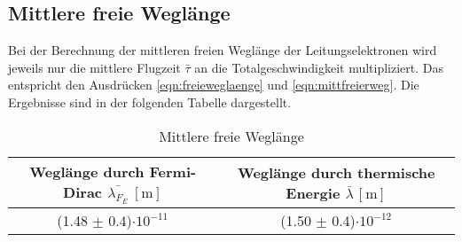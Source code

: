 \subsection{Mittlere freie Weglänge}
Bei der Berechnung der mittleren freien Weglänge der Leitungselektronen wird jeweils nur die mittlere Flugzeit $\bar{\tau}$ an die Totalgeschwindigkeit multipliziert.
Das entspricht den Ausdrücken \eqref{eqn:freieweglaenge} und \eqref{eqn:mittfreierweg}.
Die Ergebnisse sind in der folgenden Tabelle dargestellt.
\begin{table}
  \centering
  \caption{Mittlere freie Weglänge}
  \label{tab:tabweg}
  \begin{tabular}{c c }
    Weglänge durch Fermi-Dirac {$\bar{\lambda_{F_{E}}} \: [\si{\meter}]$} & Weglänge durch thermische Energie {$\bar{\lambda} \, [\si{\meter}]$} \\
    \midrule
    (1.48 $\pm$ 0.4)$\cdot 10^{-11}$  & (1.50 $\pm$ 0.4)$\cdot 10^{-12}$\\
    \bottomrule
  \end{tabular}
\end{table}
